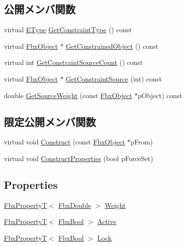 \subsection*{公開メンバ関数}
\begin{DoxyCompactItemize}
\item 
virtual \hyperlink{class_fbx_constraint_a49c1634663395eab7c28856df233ec66}{E\+Type} \hyperlink{class_fbx_constraint_adbeea66a1a605531a019aa6df90dc45b}{Get\+Constraint\+Type} () const
\item 
virtual \hyperlink{class_fbx_object}{Fbx\+Object} $\ast$ \hyperlink{class_fbx_constraint_a7f587d5db9685b5ee925a85354263edc}{Get\+Constrained\+Object} () const
\item 
virtual int \hyperlink{class_fbx_constraint_aa702f86c6a1832ce3b4905911e66c58f}{Get\+Constraint\+Source\+Count} () const
\item 
virtual \hyperlink{class_fbx_object}{Fbx\+Object} $\ast$ \hyperlink{class_fbx_constraint_a5ff6fe6fc98af1e33e8b297bc1cea007}{Get\+Constraint\+Source} (int) const
\item 
double \hyperlink{class_fbx_constraint_a4466dd54c32b822252c5e960d0be1836}{Get\+Source\+Weight} (const \hyperlink{class_fbx_object}{Fbx\+Object} $\ast$p\+Object) const
\end{DoxyCompactItemize}
\subsection*{限定公開メンバ関数}
\begin{DoxyCompactItemize}
\item 
virtual void \hyperlink{class_fbx_constraint_a6350b98fa8717caf9167c5513824310c}{Construct} (const \hyperlink{class_fbx_object}{Fbx\+Object} $\ast$p\+From)
\item 
virtual void \hyperlink{class_fbx_constraint_a0470a25b813b337d07a03ce4b97b44f8}{Construct\+Properties} (bool p\+Force\+Set)
\end{DoxyCompactItemize}
\subsection*{Properties}
\begin{DoxyCompactItemize}
\item 
\hyperlink{class_fbx_property_t}{Fbx\+PropertyT}$<$ \hyperlink{fbxtypes_8h_a171e72a1c46fc15c1a6c9c31948c1c5b}{Fbx\+Double} $>$ \hyperlink{class_fbx_constraint_ad056a05f11bcd1df8aae65fa6ab941d6}{Weight}
\item 
\hyperlink{class_fbx_property_t}{Fbx\+PropertyT}$<$ \hyperlink{fbxtypes_8h_a92e0562b2fe33e76a242f498b362262e}{Fbx\+Bool} $>$ \hyperlink{class_fbx_constraint_ab34f884cb053f5bb9c18f65582ab84e1}{Active}
\item 
\hyperlink{class_fbx_property_t}{Fbx\+PropertyT}$<$ \hyperlink{fbxtypes_8h_a92e0562b2fe33e76a242f498b362262e}{Fbx\+Bool} $>$ \hyperlink{class_fbx_constraint_a591ebe51dd090af37644355200b70d9a}{Lock}
\end{DoxyCompactItemize}

